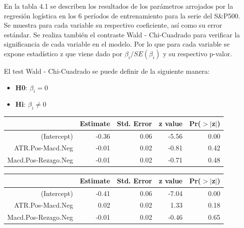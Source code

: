 \documentclass[a4paper,12pt]{Latex/Classes/PhDthesisPSnPDF}
\begin{document}
En la tabla 4.1 se describen los resultados de los parámetros arrojados por la regresión logística en los 6 períodos de entrenamiento para la serie del S\&P500. Se muestra para cada variable su respectivo coeficiente, así como su error estándar. Se realiza también el contraste Wald - Chi-Cuadrado para verificar la significancia de cada variable en el modelo. Por lo que para cada variable se expone estadístico z que viene dado por $\beta_{i}/SE(\beta_{i})$ y su respectivo p-valor.

El test Wald - Chi-Cuadrado se puede definir de la siguiente manera:

\begin{itemize}
\item \textbf{H0}: $\beta_{i} = 0$
\item \textbf{Hi}: $\beta_{i} \neq 0$
\end{itemize}

\begin{center}
\begin{table}[ht]
\centering
\begin{tabular}{rrrrr}
  \hline
 & Estimate & Std. Error & z value & Pr($>$$|$z$|$) \\ 
  \hline
(Intercept) & -0.36 & 0.06 & -5.56 & 0.00 \\ 
  ATR.Pos-Macd.Neg & -0.01 & 0.02 & -0.81 & 0.42 \\ 
  Macd.Pos-Rezago.Neg & -0.01 & 0.02 & -0.71 & 0.48 \\ 
   \hline
\end{tabular}
\end{table}\end{center}

\begin{center}
\begin{table}[ht]
\centering
\begin{tabular}{rrrrr}
  \hline
 & Estimate & Std. Error & z value & Pr($>$$|$z$|$) \\ 
  \hline
(Intercept) & -0.41 & 0.06 & -7.04 & 0.00 \\ 
  ATR.Pos-Macd.Neg & 0.02 & 0.02 & 1.33 & 0.18 \\ 
  Macd.Pos-Rezago.Neg & -0.01 & 0.02 & -0.46 & 0.65 \\ 
   \hline
\end{tabular}
\end{table}\end{center}
\end{document}
